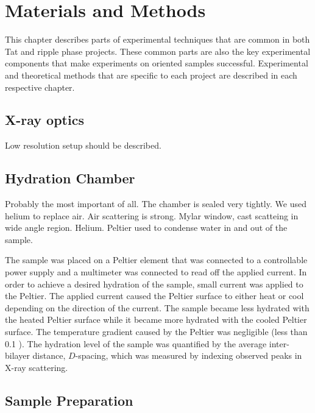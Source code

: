 \chapter{Materials and Methods}
This chapter describes parts of experimental techniques that are common
in both Tat and ripple phase projects.
These common parts are also the key experimental components that make
experiments on oriented samples successful. Experimental and theoretical
methods that are specific to each project are described in each
respective chapter.

\section{X-ray optics}
Low resolution setup should be described.

\section{Hydration Chamber}
Probably the most important of all.
The chamber is sealed very tightly. We used helium to replace air. Air 
scattering is strong. 
Mylar window, cast scatteing in wide angle region. Helium. Peltier used to 
condense water in and out of the sample.  

The sample was placed on a Peltier element that was connected to a controllable 
power supply and a multimeter was connected to read off the applied
current. 
In order to achieve a desired hydration of the sample,
small current was applied to the Peltier. 
The applied current caused the Peltier surface to either heat or cool
depending on the direction of the current. The sample became less hydrated
with the heated Peltier surface while it became more hydrated with the
cooled Peltier surface.
The temperature gradient caused by the Peltier was negligible 
(less than 0.1 \textcelsius). The hydration level of the sample
was quantified by the average inter-bilayer distance, $D$-spacing,
which was measured by indexing observed peaks in X-ray scattering.

\section{Sample Preparation}
